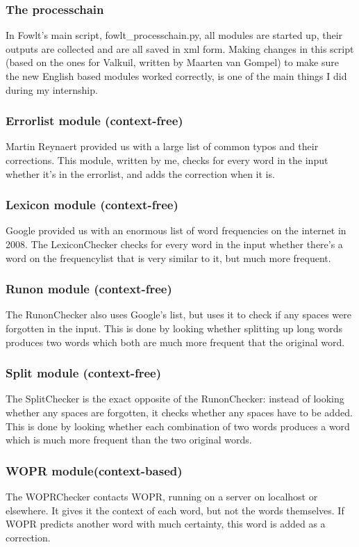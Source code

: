 \documentclass[12pt]{article}
\begin{document}
\subsubsection{The processchain}
In Fowlt's main script, fowlt\_processchain.py, all modules are started up, their outputs are collected and are all saved in xml form. Making changes in this script (based on the ones for Valkuil, written by Maarten van Gompel) to make sure the new English based modules worked correctly, is one of the main things I did during my internship. 

\subsubsection{Errorlist module (context-free)}
Martin Reynaert provided us with a large list of common typos and their corrections. This module, written by me, checks for every word in the input whether it's in the errorlist, and adds the correction when it is.

\subsubsection{Lexicon module (context-free)}
Google provided us with an enormous list of word frequencies on the internet in 2008. The LexiconChecker checks for every word in the input whether there's a word on the frequencylist that is very similar to it, but much more frequent.

\subsubsection{Runon module (context-free)}
The RunonChecker also uses Google's list, but uses it to check if any spaces were forgotten in the input. This is done by looking whether splitting up long words produces two words which both are much more frequent that the original word.

\subsubsection{Split module (context-free)}
The SplitChecker is the exact opposite of the RunonChecker: instead of looking whether any spaces are forgotten, it checks whether any spaces have to be added. This is done by looking whether each combination of two words produces a word which is much more frequent than the two original words.

\subsubsection{WOPR module(context-based)}
The WOPRChecker contacts WOPR, running on a server on localhost or elsewhere. It gives it the context of each word, but not the words themselves. If WOPR predicts another word with much certainty, this word is added as a correction.  
\end{document}
